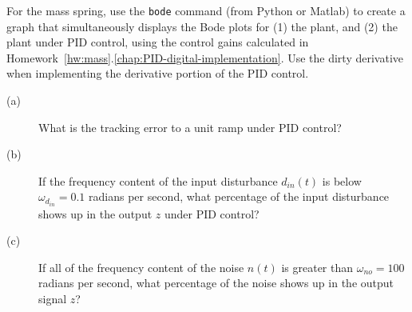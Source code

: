 For the mass spring, use the \texttt{bode} command (from Python or Matlab) to create a graph that simultaneously displays the Bode plots for (1) the plant,  and (2) the plant under PID control, using the control gains calculated in Homework~\ref{hw:mass}.\ref{chap:PID-digital-implementation}. Use the dirty derivative when implementing the derivative portion of the PID control. 
\begin{description}
\item[(a)] What is the tracking error to a unit ramp under PID control? 
\item[(b)] If the frequency content of the input disturbance $d_{in}(t)$ is below $\omega_{d_{in}} = 0.1$ radians per second, what percentage of the input disturbance shows up in the output $z$ under PID control?
\item[(c)] If all of the frequency content of the noise $n(t)$ is greater than $\omega_{no} = 100$ radians per second, what percentage of the noise shows up in the output signal $z$?
\end{description}
